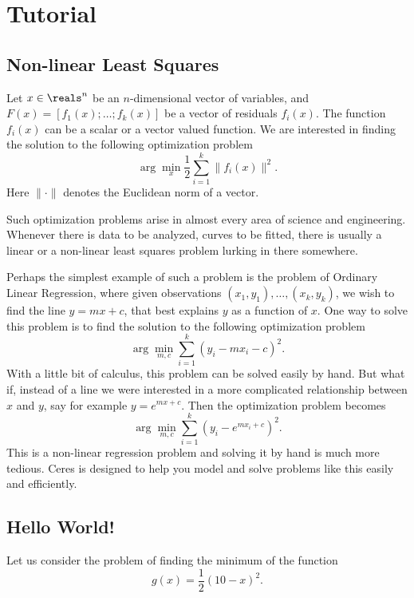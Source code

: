 \chapter{Tutorial}
\label{chapter:tutorial}

\section{Non-linear Least Squares}
\label{sec:tutorial:nonlinsq}
Let $x \in \reals^n$ be an $n$-dimensional vector of variables, and
$F(x) = \left[f_1(x); \hdots ; f_k(x)\right]$ be a vector of residuals $f_i(x)$. 
The function $f_i(x)$ can be a scalar or a vector valued
function.   We are interested in finding the solution to the following optimization problem
\begin{equation}
	\arg \min_x \frac{1}{2} \sum_{i=1}^k \|f_i(x)\|^2.
\end{equation}
Here $\|\cdot\|$ denotes the Euclidean norm of a vector. 

Such optimization problems arise in almost every area of science and engineering. Whenever there is data to be analyzed, curves to be fitted, there is usually a linear or a non-linear least squares problem lurking in there somewhere. 

Perhaps the simplest example of such a problem is the problem of Ordinary Linear Regression, where given observations $(x_1,y_1),\hdots, (x_k,y_k)$, we wish to find the line $y = mx + c$, that best explains $y$ as a function of $x$. One way to solve this problem is to find the solution to the following optimization problem
\begin{equation}
		\arg\min_{m,c} \sum_{i=1}^k (y_i - m x_i - c)^2.
\end{equation}
With a little bit of calculus, this problem can be solved easily by hand. But what if, instead of a line we were interested in a more complicated relationship between $x$ and $y$, say for example $y = e^{mx + c}$. Then the optimization problem becomes
\begin{equation}
		\arg\min_{m,c} \sum_{i=1}^k \left(y_i - e^{m x_i + c}\right)^2.
\end{equation}
This is a  non-linear regression problem and solving it by hand is much more tedious.  Ceres is designed to help you model and solve problems like this easily and efficiently.

\section{Hello World!}
\label{sec:tutorial:helloworld}
Let us consider the problem of finding the minimum of the function
\begin{equation}
	g(x) = \frac{1}{2}(10 -x)^2.
\end{equation}

